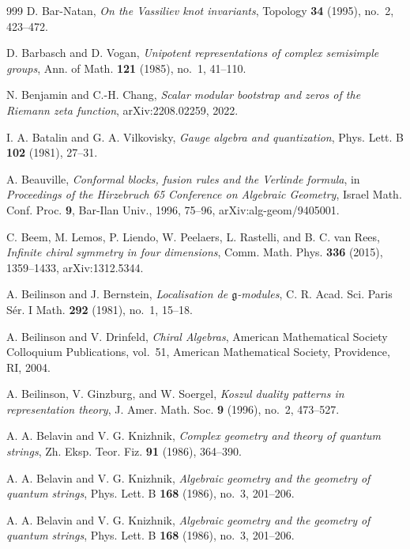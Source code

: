 \begin{thebibliography}{999}
D. Bar-Natan, \emph{On the Vassiliev knot invariants}, Topology \textbf{34} (1995), no.~2, 423--472.

D. Barbasch and D. Vogan, \emph{Unipotent representations of complex semisimple groups}, Ann. of Math. \textbf{121} (1985), no.~1, 41--110.

N. Benjamin and C.-H. Chang, \emph{Scalar modular bootstrap and zeros of the Riemann zeta function}, arXiv:2208.02259, 2022.

I. A. Batalin and G. A. Vilkovisky, \emph{Gauge algebra and quantization}, Phys. Lett. B \textbf{102} (1981), 27--31.

A. Beauville, \emph{Conformal blocks, fusion rules and the Verlinde formula}, in \emph{Proceedings of the Hirzebruch 65 Conference on Algebraic Geometry}, Israel Math. Conf. Proc. \textbf{9}, Bar-Ilan Univ., 1996, 75--96, arXiv:alg-geom/9405001.

C. Beem, M. Lemos, P. Liendo, W. Peelaers, L. Rastelli, and B. C. van Rees, \emph{Infinite chiral symmetry in four dimensions}, Comm. Math. Phys. \textbf{336} (2015), 1359--1433, arXiv:1312.5344.

A. Beilinson and J. Bernstein, \emph{Localisation de $\mathfrak{g}$-modules}, C. R. Acad. Sci. Paris S\'er. I Math. \textbf{292} (1981), no.~1, 15--18.

A. Beilinson and V. Drinfeld, \emph{Chiral Algebras}, American Mathematical Society Colloquium Publications, vol.~51, American Mathematical Society, Providence, RI, 2004.

A. Beilinson, V. Ginzburg, and W. Soergel, \emph{Koszul duality patterns in representation theory}, J. Amer. Math. Soc. \textbf{9} (1996), no.~2, 473--527.

A. A. Belavin and V. G. Knizhnik, \emph{Complex geometry and theory of quantum strings}, Zh. Eksp. Teor. Fiz. \textbf{91} (1986), 364--390.

A. A. Belavin and V. G. Knizhnik, \emph{Algebraic geometry and the geometry of quantum strings}, Phys. Lett. B \textbf{168} (1986), no.~3, 201--206.

A. A. Belavin and V. G. Knizhnik, \emph{Algebraic geometry and the geometry of quantum strings}, Phys. Lett. B \textbf{168} (1986), no.~3, 201--206.


\end{thebibliography}
